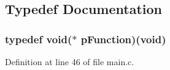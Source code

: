 \subsection{\-Typedef \-Documentation}
\hypertarget{group___flying_f4_b_l_ga9227bf1f1a9c633a0cc9ca50cc761c1a}{
\subsubsection[{p\-Function}]{\setlength{\rightskip}{0pt plus 5cm}typedef void($\ast$ {\bf p\-Function})(void)}}\label{group___flying_f4_b_l_ga9227bf1f1a9c633a0cc9ca50cc761c1a}


\-Definition at line 46 of file main.\-c.



